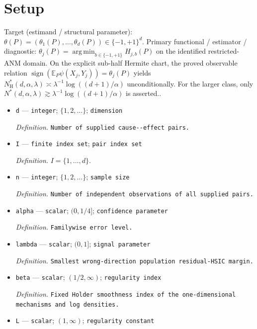 \documentclass{article}
\begin{document}
\section{Setup}

Target (estimand / structural parameter): \(\theta(P)=(\theta_1(P),\ldots,\theta_d(P))\in\{-1,+1\}^d\).
Primary functional / estimator / diagnostic: \(\theta_j(P)=\operatorname*{arg\,min}_{b\in\{-1,+1\}}H_{j,b}(P)\) on the identified restricted-ANM domain. On the explicit sub-half Hermite chart, the proved observable relation \(\operatorname{sign}(\mathbb E_P\psi(X_j,Y_j))=\theta_j(P)\) yields \(N_{\mathrm H}^*(d,\alpha,\lambda)\asymp\lambda^{-1}\log((d+1)/\alpha)\) unconditionally. For the larger class, only \(N^*(d,\alpha,\lambda)\gtrsim\lambda^{-1}\log((d+1)/\alpha)\) is asserted..
\begin{itemize}
  \item \texttt{d} --- \texttt{integer}; \(\{1,2,\ldots\}\); \texttt{dimension}
  \par\smallskip\noindent\emph{Definition.} \texttt{Number of supplied cause-\allowbreak{}-\allowbreak{}effect pairs.}
  \item \texttt{I} --- \texttt{finite index set}; \texttt{pair index set}
  \par\smallskip\noindent\emph{Definition.} \(I=\{1,\ldots,d\}\).
  \item \texttt{n} --- \texttt{integer}; \(\{1,2,\ldots\}\); \texttt{sample size}
  \par\smallskip\noindent\emph{Definition.} \texttt{Number of independent observations of all supplied pairs.}
  \item \texttt{alpha} --- \texttt{scalar}; \((0,1/4]\); \texttt{confidence parameter}
  \par\smallskip\noindent\emph{Definition.} \texttt{Familywise error level.}
  \item \texttt{lambda} --- \texttt{scalar}; \((0,1]\); \texttt{signal parameter}
  \par\smallskip\noindent\emph{Definition.} \texttt{Smallest wrong-\allowbreak{}direction population residual-\allowbreak{}HSIC margin.}
  \item \texttt{beta} --- \texttt{scalar}; \((1/2,\infty)\); \texttt{regularity index}
  \par\smallskip\noindent\emph{Definition.} \texttt{Fixed Holder smoothness index of the one-\allowbreak{}dimensional mechanisms and log densities.}
  \item \texttt{L} --- \texttt{scalar}; \((1,\infty)\); \texttt{regularity constant}

\end{itemize}
\end{document}
